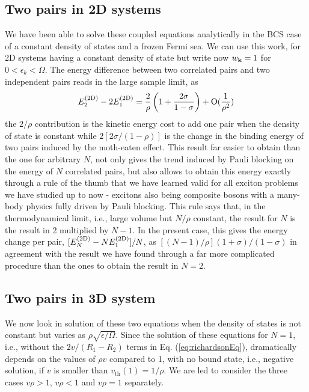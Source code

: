 \documentclass[aps,prb,showpacs,reprint]{revtex4-1}
\begin{document}
\subsection{Two pairs in 2D systems}
We have been able to solve these coupled equations analytically in the BCS case of a constant density of states and a frozen Fermi sea\cite{combescotBCS}.  We can use  this work,  for 2D systems having a constant density of state but write now $w_{\mathbf{k}}=1$ for $0<\epsilon_k<\Omega$. The energy difference between two correlated pairs and two independent pairs reads in the large sample limit, as 
\begin{equation}
E^{{{\text{(2D)}}}}_2-2E_1^{{{\text{(2D)}}}}=\frac{2}{\rho}\left(1+\frac{2\sigma}{1-\sigma}\right)+\text{O}(\frac{1}{\rho^2})
\label{eq:}
\end{equation}
the $2/\rho$ contribution is the kinetic energy cost to add one pair when the density of state is constant while $2[2\sigma/(1-\rho)]$ is the change in the binding energy of two pairs induced by the moth-eaten effect. This result far easier to obtain than the one for arbitrary $N$, not only gives the trend induced by Pauli blocking on the energy of $N$ correlated pairs, but also allows to obtain this energy exactly through a rule of the thumb that we have learned valid for all exciton problems we have studied up to now - excitons also being composite bosons with a many-body physics fully driven by Pauli blocking.  This rule says that, in the thermodynamical limit, i.e., large volume but $N/\rho$ constant, the result for $N$ is the result in 2 multiplied by $N-1$.  In the present case, this gives the energy change per pair, $[E^{{{\text{(2D)}}}}_N-NE^{{{\text{(2D)}}}}_1]/N$, as $[(N-1)/\rho](1+\sigma)/(1-\sigma)$ in agreement with the result we have found through a far more complicated procedure than the ones to obtain the result in $N=2$.

\subsection{Two pairs in 3D system}
We now look in solution of these two equations when the density of states is not constant but varies as $\rho\sqrt{\epsilon/\Omega}$.  Since the solution of these equations for $N=1$, i.e., without the $2v/(R_1-R_2)$ terms in Eq. (\ref{eq:richardsonEq}), dramatically depends on the values of $\rho{}v$ compared to 1, with no bound state, i.e., negative solution, if $v$ is smaller than $v_{\text{th}}(1)=1/\rho$. We are led to consider the three cases $v\rho>1$, $v\rho<1$ and $v\rho=1$ separately. 
\end{document}
